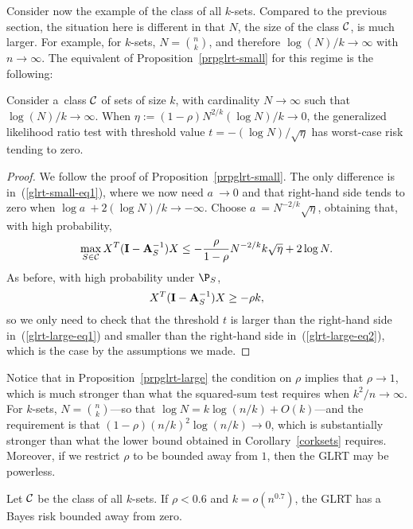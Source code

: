 \documentclass[10pt, oneside]{article}
\begin{document}
Consider now the example of the class of all $k$-sets.
Compared to the previous section, the situation here is different in that
$N$, the size of the class ${\mathcal C}$, is much larger. For example, for
$k$-sets, $N = {n \choose k}$, and
therefore $\log(N)/k \to\infty$ with $n \to\infty$. The
equivalent\vspace*{1pt} of Proposition~\ref{prpglrt-small} for this regime is the
following:
%
\begin{prop} \label{prpglrt-large}
Consider a~class ${\mathcal C}$ of sets of size $k$, with cardinality $N \to
\infty$ such that $\log(N)/k
\to\infty$. When $\eta:= (1-\rho) N^{2/k} (\log N)/k \to0$, the
generalized likelihood
ratio test with threshold value $t = -(\log N)/\sqrt{\eta}$ has
worst-case
risk tending to zero.
\end{prop}
%
\begin{proof}
We follow the proof of Proposition~\ref{prpglrt-small}. The only
difference is in~(\ref{glrt-small-eq1}), where we now need $a~\to0$ and that
right-hand side tends to zero when $\log a~+ 2 (\log N)/k \to-\infty
$. Choose $a~= N^{-2/k} \sqrt{\eta}$, obtaining that, with\vadjust{\goodbreak} high probability,
%
\begin{equation} \label{glrt-large-eq1}
\max_{S \in{\mathcal C}} X^T (\mathbf{I}- \mathbf{A}_S^{-1}) X \leq-\frac\rho{1-\rho}
N^{-2/k} k \sqrt{\eta} + 2 \log N.
\end{equation}
%
As before, with high probability under $\P_S$,
%
\begin{equation} \label{glrt-large-eq2}
X^T (\mathbf{I}- \mathbf{A}_S^{-1}) X \geq- \rho k,
\end{equation}
%
so we only need to check that the threshold $t$ is larger than the
right-hand side in~(\ref{glrt-large-eq1}) and smaller than the
right-hand side in~(\ref{glrt-large-eq2}), which is the case by the
assumptions we made.
\end{proof}

Notice that in Proposition~\ref{prpglrt-large} the condition on $\rho
$ implies
that $\rho\to1$, which is much stronger than what the squared-sum
test requires when $k^2/n \to\infty$.
For $k$-sets, $N = {n \choose k}$---so that $\log N = k \log(n/k) +
O(k)$---and the requirement is that $(1-\rho) (n/k)^2 \log(n/k) \to
0$, which is substantially stronger than what the lower bound obtained
in Corollary~\ref{corksets} requires. Moreover, if we restrict $\rho
$ to be bounded away from $1$, then the GLRT may be powerless.
%
%
\begin{thm}
\label{thmglrt-bad}
Let ${\mathcal C}$ be the class of all $k$-sets. If $\rho< 0.6$ and $k=
o(n^{0.7})$, the GLRT has a~%
Bayes
risk bounded away from zero.
\end{thm}
\end{document}
